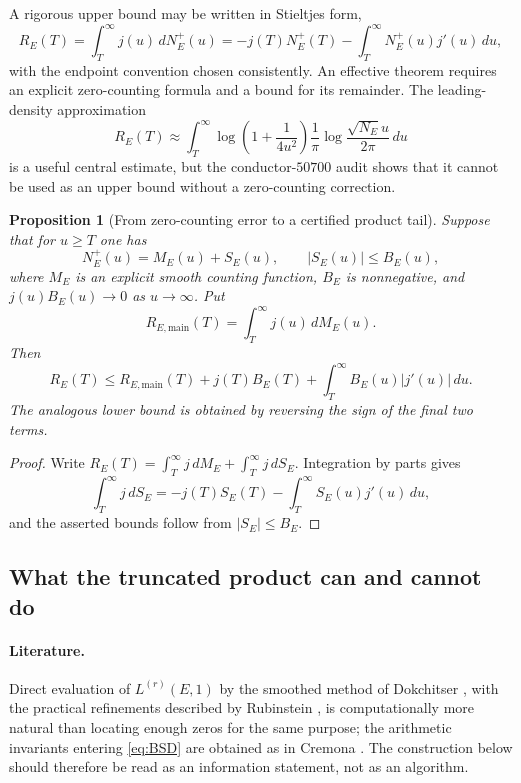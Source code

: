 \documentclass[11pt,reqno]{amsart}
\newtheorem{proposition}{Proposition}
\theoremstyle{remark}
\begin{document}
A rigorous upper bound may be written in Stieltjes form,
\begin{equation}
  R_E(T)
  =\int_T^\infty j(u)\,dN_E^+(u)
  =-j(T)N_E^+(T)-\int_T^\infty N_E^+(u)j'(u)\,du,
  \label{eq:tail-bound}
\end{equation}
with the endpoint convention chosen consistently.  An effective theorem requires an explicit zero-counting formula and a bound for its remainder.  The leading-density approximation
\begin{equation}
  R_E(T)\approx
  \int_T^\infty
  \log\!\left(1+\frac{1}{4u^2}\right)
  \frac1\pi\log\frac{\sqrt{N_E}u}{2\pi}\,du
  \label{eq:tail-heuristic}
\end{equation}
is a useful central estimate, but the conductor-$50700$ audit shows that it cannot be used as an upper bound without a zero-counting correction.

\begin{proposition}[From zero-counting error to a certified product tail]
\label{prop:counting-to-tail}
Suppose that for $u\ge T$ one has
\begin{equation}
  N_E^+(u)=M_E(u)+S_E(u),
  \qquad |S_E(u)|\le B_E(u),
\end{equation}
where $M_E$ is an explicit smooth counting function, $B_E$ is nonnegative, and $j(u)B_E(u)\to0$ as $u\to\infty$.  Put
\begin{equation}
  R_{E,\mathrm{main}}(T)=\int_T^\infty j(u)\,dM_E(u).
\end{equation}
Then
\begin{equation}
  \boxed{
  R_E(T)\le R_{E,\mathrm{main}}(T)
  +j(T)B_E(T)
  +\int_T^\infty B_E(u)|j'(u)|\,du .
  }
  \label{eq:certified-tail-from-counting}
\end{equation}
The analogous lower bound is obtained by reversing the sign of the final two terms.
\end{proposition}

\begin{proof}
Write $R_E(T)=\int_T^\infty j\,dM_E+\int_T^\infty j\,dS_E$.  Integration by parts gives
\[
  \int_T^\infty j\,dS_E
  =-j(T)S_E(T)-\int_T^\infty S_E(u)j'(u)\,du,
\]
and the asserted bounds follow from $|S_E|\le B_E$.
\end{proof}

\subsection{What the truncated product can and cannot do}

\paragraph{Literature.}
Direct evaluation of $L^{(r)}(E,1)$ by the smoothed method of Dokchitser \cite{Dokchitser2004}, with the practical refinements described by Rubinstein \cite{RubinsteinLNS2005}, is computationally more natural than locating enough zeros for the same purpose; the arithmetic invariants entering \eqref{eq:BSD} are obtained as in Cremona \cite{Cremona1997}.  The construction below should therefore be read as an information statement, not as an algorithm.
\end{document}
